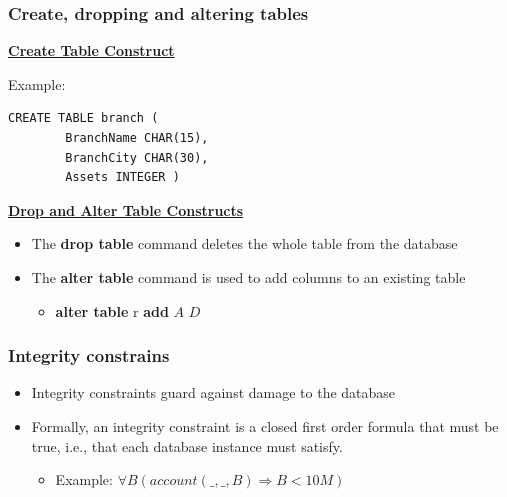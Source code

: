 \subsubsection{Create, dropping and altering tables}
\textbf{\underline{Create Table Construct}}
\bigskip

Example: 
\begin{lstlisting}[caption= Create Table Example]
    CREATE TABLE branch (
        BranchName CHAR(15),
        BranchCity CHAR(30),
        Assets INTEGER )
\end{lstlisting}

\textbf{\underline{Drop and Alter Table Constructs}}
\bigskip
\begin{itemize}
    \item The \textbf{drop table} command deletes the whole table from the database
    \item The \textbf{alter table} command is used to add columns to an existing table
    \begin{itemize}
        \item[] \textbf{alter table} r \textbf{add} $A$ $D$ 
    \end{itemize}
\end{itemize}


\subsubsection{Integrity constrains}

\begin{itemize}
    \item Integrity constraints guard against damage to the database
    \item Formally, an integrity constraint is a closed first order formula that must be true, i.e., that each database instance must satisfy.
    \begin{itemize}
        \item Example: $\forall B(account(\_,\_,B) \Rightarrow B<10M)$
    \end{itemize}
\end{itemize}

